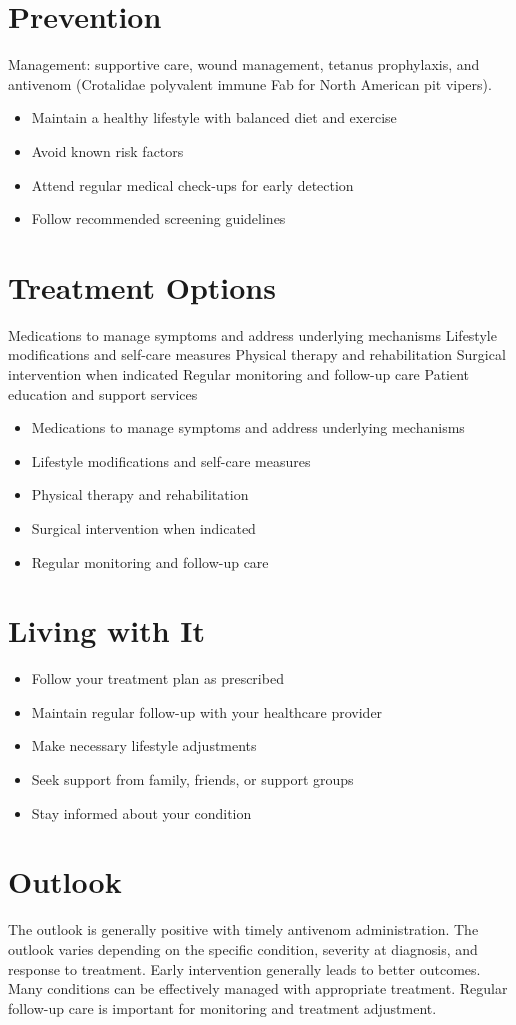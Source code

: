 \section{Prevention}
Management: supportive care, wound management, tetanus prophylaxis, and antivenom (Crotalidae polyvalent immune Fab for North American pit vipers).

\begin{itemize}[noitemsep]
  \item Maintain a healthy lifestyle with balanced diet and exercise
  \item Avoid known risk factors
  \item Attend regular medical check-ups for early detection
  \item Follow recommended screening guidelines
\end{itemize}
\section{Treatment Options}
Medications to manage symptoms and address underlying mechanisms Lifestyle modifications and self-care measures Physical therapy and rehabilitation Surgical intervention when indicated Regular monitoring and follow-up care Patient education and support services

\begin{itemize}[noitemsep]
  \item Medications to manage symptoms and address underlying mechanisms
  \item Lifestyle modifications and self-care measures
  \item Physical therapy and rehabilitation
  \item Surgical intervention when indicated
  \item Regular monitoring and follow-up care
\end{itemize}
\section{Living with It}
\begin{itemize}[noitemsep]
  \item Follow your treatment plan as prescribed
  \item Maintain regular follow-up with your healthcare provider
  \item Make necessary lifestyle adjustments
  \item Seek support from family, friends, or support groups
  \item Stay informed about your condition
\end{itemize}
\section{Outlook}
The outlook is generally positive with timely antivenom administration. The outlook varies depending on the specific condition, severity at diagnosis, and response to treatment. Early intervention generally leads to better outcomes. Many conditions can be effectively managed with appropriate treatment. Regular follow-up care is important for monitoring and treatment adjustment.
